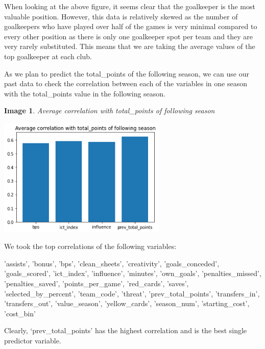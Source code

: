 \documentclass[12pt, a4paper, oneside]{book}
\newtheorem{image}[theorem]{Image}
\numberwithin{equation}{section}
\begin{document}
When looking at the above figure, it seems clear that the goalkeeper is the most valuable position. However, this data is relatively skewed as the number of goalkeepers who have played over half of the games is very minimal compared to every other position as there is only one goalkeeper spot per team and they are very rarely substituted. This means that we are taking the average values of the top goalkeeper at each club.

\vspace{0.5cm}

As we plan to predict the total\_points of the following season, we can use our past data to check the correlation between each of the variables in one season with the total\_points value in the following season.

\begin{image} \label{total points correlation}
  Average correlation with total\_points of following season

  \vspace{0.5cm}

  \centerline{\includegraphics[width=0.6\textwidth]{images/prediction/pre-analysis/avg-corr-with-total-points-seasonal.png}}
\end{image}

We took the top correlations of the following variables:

'assists', 'bonus', 'bps', 'clean\_sheets', 'creativity', 'goals\_conceded', 'goals\_scored', 'ict\_index', 'influence', 'minutes', 'own\_goals', 'penalties\_missed', 'penalties\_saved', 'points\_per\_game', 'red\_cards', 'saves', 'selected\_by\_percent', 'team\_code', 'threat', 'prev\_total\_points', 'transfers\_in', 'transfers\_out', 'value\_season', 'yellow\_cards', 'season\_num', 'starting\_cost', 'cost\_bin'

\vspace{0.3cm}

Clearly, `prev\_total\_points' has the highest correlation and is the best single predictor variable.
\end{document}
